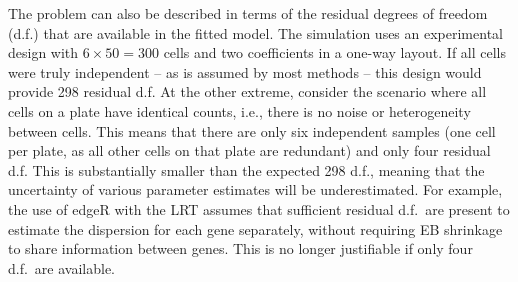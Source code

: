 \documentclass[oupdraft]{bio}
\begin{document}
The problem can also be described in terms of the residual degrees of freedom (d.f.) that are available in the fitted model.
The simulation uses an experimental design with $6 \times 50 =  300$ cells and two coefficients in a one-way layout.
If all cells were truly independent -- as is assumed by most methods -- this design would provide 298 residual d.f. 
At the other extreme, consider the scenario where all cells on a plate have identical counts, i.e., there is no noise or heterogeneity between cells.
This means that there are only six independent samples (one cell per plate, as all other cells on that plate are redundant) and only four residual d.f.
This is substantially smaller than the expected 298 d.f., meaning that the uncertainty of various parameter estimates will be underestimated.
For example, the use of edgeR with the LRT assumes that sufficient residual d.f.\ are present to estimate the dispersion for each gene separately,
    without requiring EB shrinkage to share information between genes.
This is no longer justifiable if only four d.f.\ are available.
\end{document}

